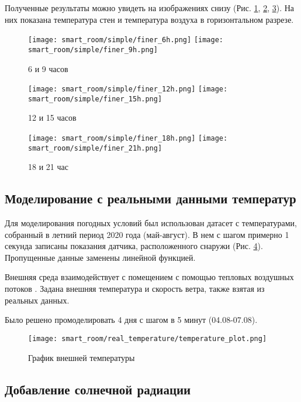 Полученные результаты можно увидеть на изображениях снизу (Рис. \ref{6-9}, \ref{12-15}, \ref{18-21}). На них показана температура стен и температура воздуха в горизонтальном разрезе.

\begin{figure}[H]
\texttt{[image: smart\_room/simple/finer\_6h.png]}\hfill
\texttt{[image: smart\_room/simple/finer\_9h.png]}
\caption{6 и 9 часов}
\label{6-9}
\end{figure}

\begin{figure}[H]
\texttt{[image: smart\_room/simple/finer\_12h.png]}\hfill
\texttt{[image: smart\_room/simple/finer\_15h.png]}
\caption{12 и 15 часов}
\label{12-15}
\end{figure}

\begin{figure}[H]
\texttt{[image: smart\_room/simple/finer\_18h.png]}\hfill
\texttt{[image: smart\_room/simple/finer\_21h.png]}
\caption{18 и 21 час}
\label{18-21}
\end{figure}
\newpage


\subsection{Моделирование с реальными данными температур}

Для моделирования погодных условий был использован датасет с температурами, собранный в летний период 2020 года (май-август). В нем с шагом примерно 1 секунда записаны показания датчика, расположенного снаружи (Рис. \ref{real-temperature-plot}). Пропущенные данные заменены линейной функцией.

Внешняя среда взаимодействует с помещением с помощью тепловых воздушных потоков \cite{heat-flux}. Задана внешняя температура и скорость ветра, также взятая из реальных данных. 

Было решено промоделировать 4 дня с шагом в 5 минут (04.08-07.08). 

\begin{figure}[H]
\texttt{[image: smart\_room/real\_temperature/temperature\_plot.png]}
\caption{График внешней температуры}
\label{real-temperature-plot}
\end{figure}

\newpage


\subsection{Добавление солнечной радиации}

